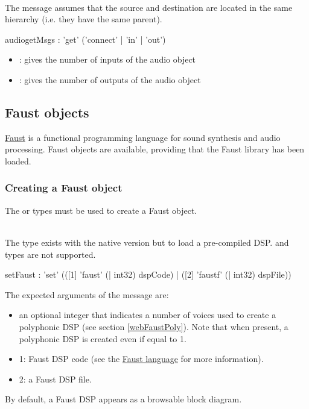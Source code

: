 \documentclass[a4paper,twoside]{article}
\newcommand{\sublevel}[1]	{\subsection{#1}}
\newcommand{\subsublevel}[1]	{\subsubsection{#1}}
\begin{document}
\note{}\\
The  message assumes that the source and destination are located in the same hierarchy (i.e. they have the same parent). 

\begin{rail}
audiogetMsgs : 'get' ('connect' | 'in' | 'out')
\end{rail}

\begin{itemize}
\item {}: gives the number of inputs of the audio object
\item {}: gives the number of outputs of the audio object
\end{itemize}

\sublevel{Faust objects}
\label{faustObjects}

\href{https://faust.grame.fr/}{Faust} is a functional programming language for sound synthesis and audio processing.
Faust objects are available, providing that the Faust library has been loaded.

\subsublevel{Creating a Faust object}
\label{webFaust}

The  or  types must be used to create a Faust object.

\note{}\\
The  type exists with the native version but to load a pre-compiled DSP.  and  types are not supported.

\begin{rail}
setFaust : 'set' (([1] 'faust' (| int32) dspCode)
				| ([2] 'faustf' (| int32) dspFile))

\end{rail}

The expected arguments of the  message are:
\begin{itemize}
\item an optional integer that indicates a number of voices used to create a polyphonic DSP (see section \ref{webFaustPoly}). Note that when present, a polyphonic DSP is created even if equal to 1.
\item 1: Faust DSP code (see the \href{https://faustdoc.grame.fr/}{Faust language} for more information).
\item 2: a Faust DSP file.
\end{itemize}

By default, a Faust DSP appears as a browsable block diagram.
\end{document}
